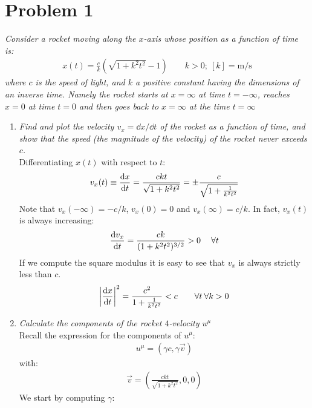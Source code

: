 \documentclass[../template.tex]{subfiles}
\begin{document}
\section{Problem 1}
\textit{Consider a rocket moving along the $x$-axis whose position as a function of time is:}
\begin{align}
    x(t) = \frac{c}{k}(\sqrt{1+k^2 t^2}-1) \qquad k>0; \> [k] = \si{\m\per\s}
    \label{eqn:x-t} 
\end{align} 
\textit{where $c$ is the speed of light, and $k$ a positive constant having the dimensions of an inverse time. Namely the rocket starts at $x=\infty$ at time $t=-\infty$, reaches $x=0$ at time $t=0$ and then goes back to $x=\infty$ at the time $t=\infty$}
\begin{enumerate}
    \item \textit{Find and plot the velocity $v_x = \dd{x}/\dd{t}$ of the rocket as a function of time, and show that the speed (the magnitude of the velocity) of the rocket never exceeds $c$.}\\
    Differentiating $x(t)$ with respect to $t$:
    \begin{align*}
        v_x(t) \equiv \dv{x}{t} = \frac{ckt}{\sqrt{1+k^2 t^2}} = \pm \frac{c}{\sqrt{1+\frac{1}{k^2 t^2} }} 
    \end{align*}   
    Note that $v_x(-\infty) = -c/k$, $v_x(0) = 0$ and $v_x(\infty) = c/k$. In fact, $v_x(t)$ is always increasing:
    \begin{align*}
        \dv{v_x}{t} = \frac{ck}{(1+k^2t^2)^{3/2}} > 0 \> \quad \forall t 
    \end{align*}    
    If we compute the square modulus it is easy to see that $v_x$ is always strictly less than $c$.  
    \begin{align*}
        \left| \dv{x}{t} \right|^2 = \frac{c^2}{1+\frac{1}{k^2 t^2}} < c \qquad \forall t \> \forall k > 0
    \end{align*}
    \item \textit{Calculate the components of the rocket $4$-velocity $u^\mu$}\\
    Recall the expression for the components of $u^\mu$:
    \begin{align*}
        u^\mu = (\gamma c, \gamma \vec{v})
    \end{align*} 
    with:
    \begin{align*}
        \vec{v} = \left(\frac{ckt}{\sqrt{1+k^2 t^2}}, 0, 0\right)
    \end{align*}
    We start by computing $\gamma$:
    \begin{align*}

\end{align*}
\end{enumerate}
\end{document}
